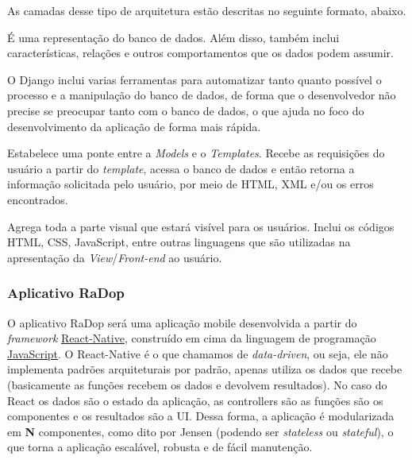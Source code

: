 As camadas desse tipo de arquitetura estão descritas no seguinte
formato, abaixo.

\label{model}

É uma representação do banco de dados. Além disso, também inclui
características, relações e outros comportamentos que os dados podem
assumir.

O Django inclui varias ferramentas para automatizar tanto quanto
possível o processo e a manipulação do banco de dados, de forma que o
desenvolvedor não precise se preocupar tanto com o banco de dados, o que
ajuda no foco do desenvolvimento da aplicação de forma mais rápida.

\label{view}

Estabelece uma ponte entre a \emph{Models} e o \emph{Templates}. Recebe
as requisições do usuário a partir do \emph{template}, acessa o banco de
dados e então retorna a informação solicitada pelo usuário, por meio de
HTML, XML e/ou os erros encontrados.

\label{template}

Agrega toda a parte visual que estará visível para os usuários. Inclui
os códigos HTML, CSS, JavaScript, entre outras linguagens que são
utilizadas na apresentação da \emph{View}/\emph{Front-end} ao usuário.

\subsubsection{Aplicativo RaDop}\label{aplicativo-radop}

O aplicativo RaDop será uma aplicação mobile desenvolvida a partir do
\emph{framework} \href{https://facebook.github.io/react-native/}{React-Native}, construído em cima da
linguagem de programação \href{https://www.javascript.com/}{JavaScript}. O
React-Native é o que chamamos de \emph{data-driven}, ou seja, ele não
implementa padrões arquiteturais por padrão, apenas utiliza os dados que
recebe (basicamente as funções recebem os dados e devolvem resultados).
No caso do React os dados são o estado da aplicação, as controllers são
as funções são os componentes e os resultados são a UI. Dessa forma, a
aplicação é modularizada em \textbf{N} componentes, como dito por Jensen \cite{jensen2018} (podendo ser
\emph{stateless} ou \emph{stateful}), o que torna a aplicação escalável,
robusta e de fácil manutenção.

\label{stateless}

